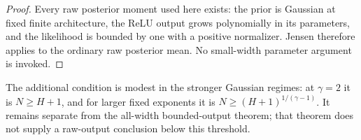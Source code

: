 \begin{proof}
Every raw posterior moment used here exists: the prior is Gaussian at fixed finite architecture, the ReLU output grows polynomially in its parameters, and the likelihood is bounded by one with a positive normalizer. Jensen therefore applies to the ordinary raw posterior mean. No small-width parameter argument is invoked.
\end{proof}

The additional condition is modest in the stronger Gaussian regimes: at $\gamma=2$ it is $N\ge H+1$, and for larger fixed exponents it is $N\ge(H+1)^{1/(\gamma-1)}$. It remains separate from the all-width bounded-output theorem; that theorem does not supply a raw-output conclusion below this threshold.
